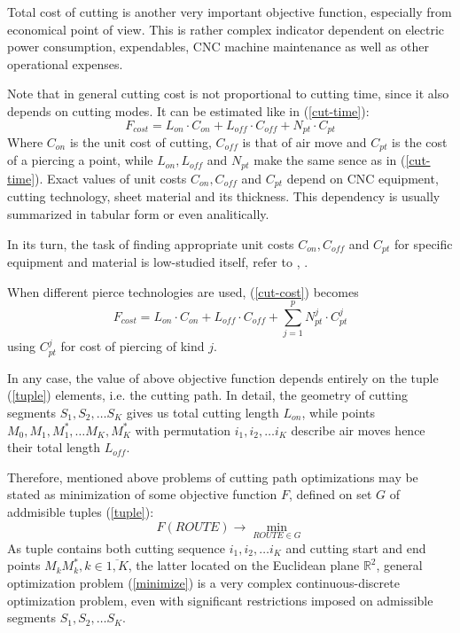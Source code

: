 \documentclass{ifacconf}
\begin{document}
Total cost of cutting is another very important
objective function,
especially from economical point of view.
This is rather complex indicator dependent on
electric power consumption,
expendables,
CNC machine maintenance
as well as other operational expenses.

Note that in general cutting cost is not
proportional to cutting time,
since it also depends on cutting modes.
It can be estimated like in (\ref{cut-time}):
\begin{equation}
    F_{cost} = L_{on}\cdot C_{on} + L_{off}\cdot C_{off} + N_{pt} \cdot C_{pt}
    \label{cut-cost}
\end{equation}
Where
$C_{on}$ is the unit cost of cutting,
$C_{off}$ is that of air move and
$C_{pt}$ is the cost of a piercing a point,
while $L_{on}, L_{off}$ and $N_{pt}$
make the same sence as in (\ref{cut-time}).
Exact values of unit costs
$C_{on}, C_{off}$ and $C_{pt}$
depend on CNC equipment, cutting technology,
sheet material and its thickness.
This dependency is usually summarized
in tabular form or even analitically.

In its turn,
the task of finding appropriate unit costs
$C_{on}, C_{off}$ and $C_{pt}$
for specific equipment and material
is  low-studied itself,
refer to
\cite{Tavaeva2015Nov},
\cite{tavaeva2014issue}.

When different pierce technologies are used,
(\ref{cut-cost}) becomes
\begin{equation}
    F_{cost} = L_{on}\cdot C_{on} + L_{off}\cdot C_{off}
    + \sum_{j=1}^p N_{pt}^j \cdot C_{pt}^j
    \label{piercings-cost}
\end{equation}
using $C_{pt}^j$ for
cost of piercing of kind $j$.

In any case,
the value of above objective function
depends entirely on the tuple
(\ref{tuple})
elements,
i.e. the cutting path.
In detail,
the geometry of cutting segments
$S_1, S_2, \dots S_K$ gives us
total cutting length $L_{on}$,
while points $M_0, M_1, M_1^*, \dots M_K, M_K^*$
with permutation $i_1, i_2, \dots i_K$
describe air moves hence their total length $L_{off}$.

Therefore,
mentioned above problems
of cutting path optimizations may be
stated as minimization of some objective function $F$,
defined on set $G$ of addmisible tuples
(\ref{tuple}):
\begin{equation}
    F(ROUTE) \to \min_{ROUTE \in G}
    \label{minimize}
\end{equation}
As tuple contains both
cutting sequence
$i_1, i_2, \dots i_K$
and cutting start and end points
$M_kM_k^*, k \in \overline{1, K}$,
the latter located on the Euclidean plane $\mathbb R^2$,
general optimization problem (\ref{minimize})
is a very complex
continuous-discrete optimization problem,
even with significant restrictions imposed
on admissible segments
$S_1, S_2, \dots S_K$.
\end{document}
